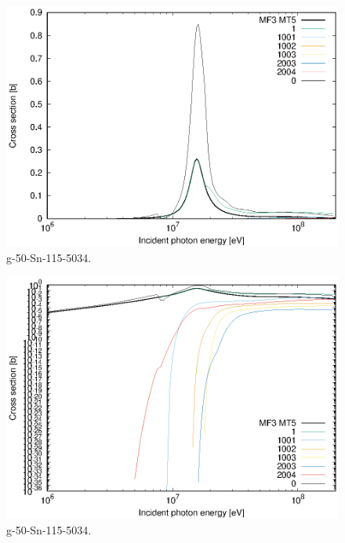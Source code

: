 \begin{figure}
 \includegraphics[width=\linewidth]{eps/g_50-Sn-115_5034.eps}
  \caption{g-50-Sn-115-5034.}
\end{figure}
\begin{figure}
 \includegraphics[width=\linewidth]{eps-log/g_50-Sn-115_5034.eps}
 \caption{g-50-Sn-115-5034.}
\end{figure}
\newpage \clearpage

